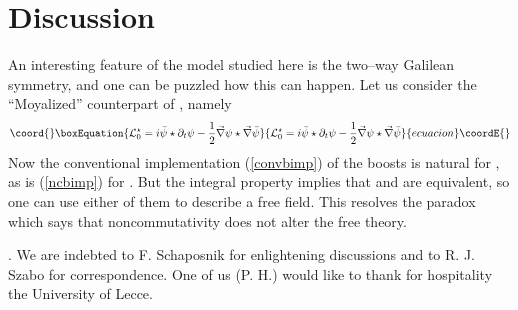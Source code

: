 \documentclass[a4paper,11pt]{article}
\let\ssection=\section
\renewcommand{\section}{\setcounter{equation}{0}\ssection}
\def\parag{\hfil\break} %
\def\kikezd{\parag\underbar}
\def\p{{\partial}}
\def\vnabla{{\vec\nabla}}
\begin{document}
\section{Discussion}

An interesting feature of the model studied here
is the two--way Galilean symmetry, and one can be
puzzled how this can happen. Let us consider the ``Moyalized''
counterpart of \coordHE{}, namely
\begin{equation}\coord{}\boxEquation{
     {\cal L}_{0}^\star
     =i\bar{\psi}\star\p_{t}\psi-
     \frac{1}{2}\vnabla\psi\star\vnabla\bar{\psi}
     \label{staraction}
}{
     {\cal L}_{0}^\star
     =i\bar{\psi}\star\p_{t}\psi-
     \frac{1}{2}\vnabla\psi\star\vnabla\bar{\psi}
     }{ecuacion}\coordE{}\end{equation}
Now the conventional implementation (\ref{convbimp})
of the boosts is natural for \coordHE{},
as is (\ref{ncbimp})
for \coordHE{}. But the integral property
\coordHE{} implies  that \coordHE{}
and \coordHE{} are equivalent, so one can use either
of them to describe a free field.
This resolves the paradox which says that
noncommutativity does not alter the free theory.


\kikezd{Acknowledgement}.
We are indebted to F. Schaposnik
for enlightening discussions and to R. J. Szabo
for correspondence. One of us (P. H.)
would like to thank for hospitality
the University of Lecce.
\end{document}
